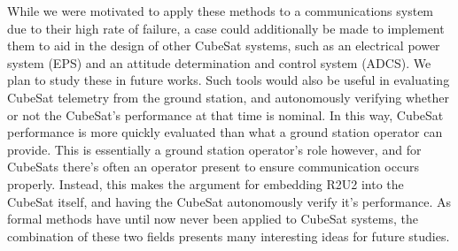 \documentclass[conf]{new-aiaa}
\begin{document}
While we were motivated to apply these methods to a communications system due to their high rate of failure, a case could additionally be made to implement them to aid in the design of other CubeSat systems, such as an electrical power system (EPS) and an attitude determination and control system (ADCS). We plan to study these in future works. Such tools would also be useful in evaluating CubeSat telemetry from the ground station, and autonomously verifying whether or not the CubeSat's performance at that time is nominal. In this way, CubeSat performance is more quickly evaluated than what a ground station operator can provide. This is essentially a ground station operator's role however, and for CubeSats there's often an operator present to ensure communication occurs properly. Instead, this makes the argument for embedding R2U2 into the CubeSat itself, and having the CubeSat autonomously verify it's performance. As formal methods have until now never been applied to CubeSat systems, the combination of these two fields presents many interesting ideas for future studies.
 

\end{document}
